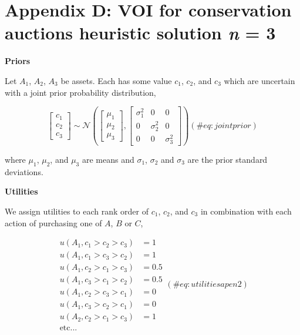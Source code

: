 \newpage

\captionsetup{labelformat=empty}

\section*{\texorpdfstring{Appendix D: VOI for conservation auctions
heuristic solution \emph{n} =
3}{Appendix D: VOI for conservation auctions heuristic solution n = 3}}\label{appendix-d-voi-for-conservation-auctions-heuristic-solution-n-3}

\textbf{Priors}

Let \(A_1\), \(A_2\), \(A_3\) be assets. Each has some value \(c_1\),
\(c_2\), and \(c_3\) which are uncertain with a joint prior probability
distribution,

\begin{equation}
\begin{bmatrix}c_1 \\ c_2 \\ c_3\end{bmatrix}\sim\mathcal{N}\left(\begin{bmatrix}\mu_1 \\ \mu_2 \\ \mu_3\end{bmatrix}, \begin{bmatrix}\sigma^2_1 & 0 & 0 \\ 0 & \sigma^2_2 & 0\\ 0 & 0 & \sigma^2_3 \end{bmatrix}\right)
(\#eq:jointprior)
\end{equation}

where \(\mu_1\), \(\mu_2\), and \(\mu_3\) are means and \(\sigma_1\),
\(\sigma_2\) and \(\sigma_3\) are the prior standard deviations.

\textbf{Utilities}

We assign utilities to each rank order of \(c_1\), \(c_2\), and \(c_3\)
in combination with each action of purchasing one of \(A\), \(B\) or
\(C\),

\begin{equation}
\begin{aligned}
u(A_1, c_1 > c_2 > c_3)&=1\\
u(A_1, c_1 > c_3 > c_2)&=1\\
u(A_1, c_2 > c_1 > c_3)&=0.5\\
u(A_1, c_3 > c_1 > c_2)&=0.5\\
u(A_1, c_2 > c_3 > c_1)&=0\\
u(A_1, c_3 > c_2 > c_1)&=0\\
u(A_2, c_2 > c_1 > c_3)&=1\\
\mathrm{etc...}&
\end{aligned}
(\#eq:utilitiesapen2)
\end{equation}

